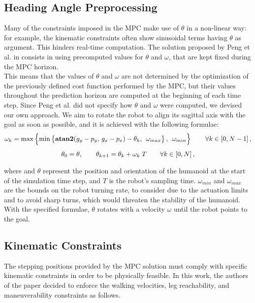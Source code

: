 \subsection{Heading Angle Preprocessing}
Many of the constraints imposed in the MPC make use of $\theta$ in a non-linear way: for example, the kinematic constraints often show sinusoidal terms having $\theta$ as argument. This hinders real-time computation. The solution proposed by Peng et al. in \cite{peng_main_paper} consists in using precomputed values for $\theta$ and $\omega$, that are kept fixed during the MPC horizon.\\
This means that the values of $\theta$ and $\omega$ are not determined by the optimization of the previously defined cost function performed by the MPC, but their values throughout the prediction horizon are computed at the beginning of each time step. Since Peng et al. did not specify how $\theta$ and $\omega$ were computed, we devised our own approach. We aim to rotate the robot to align its sagittal axis with the goal as soon as possible, and it is achieved with the following formulae:
\begin{gather}
\omega_k = \max \left\{ \min \left\{ \operatorname{\textbf{atan2}}(g_y - p_y,\, g_x - p_x) - \theta_k,\, \; \omega_{max} \right\} ,\, \; \omega_{min} \right\} \qquad \forall k \in \left[0, N-1 \right], \notag \\[1ex]
\theta_0 = \theta, \qquad \theta_{k+1} = \theta_{k} + \omega_k\;T \qquad \forall k \in \left[0, N\right], \notag
\end{gather}

where and $\theta$ represent the position and orientation of the humanoid at the start of the simulation time step, and $T$ is the robot's sampling time. $\omega_{min}$ and $\omega_{max}$ are the bounds on the robot turning rate, to consider due to the actuation limits and to avoid sharp turns, which would threaten the stability of the humanoid. With the specified formulae, $\theta$ rotates with a velocity $\omega$ until the robot points to the goal.

\subsection{Kinematic Constraints}
The stepping positions provided by the MPC solution must comply with specific kinematic constraints in order to be physically feasible. In this work, the authors of the paper decided to enforce the walking velocities, leg reachability, and maneuverability constraints as follows.

